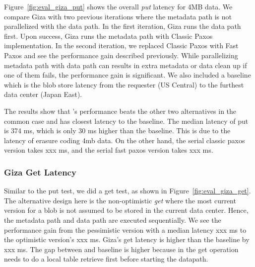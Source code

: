 Figure~\ref{fig:eval_giza_put} shows the \name overall {\em put} latency for 4MB data. We compare Giza with two previous iterations where the metadata path is not parallelized with the data path. In the first iteration, Giza runs the data path first. Upon success, Giza runs the metadata path with Classic Paxos implementation. In the second iteration, we replaced Classic Paxos with Fast Paxos and see the performance gain described previously. While parallelizing metadata path with data path can results in extra metadata or data clean up if one of them fails, the performance gain is significant. We also included a baseline which is the blob store latency from the requester (US Central) to the furthest data center (Japan East).

The results show that \name's performance beats the other two alternatives in the common case and has closest
latency to the baseline. The median latency of \name put is 374 ms, which is only 30 ms
higher than the baseline. This is due to the latency of erasure coding 4mb data. On the other hand, the serial classic paxos version takes 
xxx ms, and the serial fast paxos version takes xxx ms.

\subsubsection{Giza Get Latency}

Similar to the put test, we did a \name get test, as shown in Figure~\ref{fig:eval_giza_get}. The alternative design here is the non-optimistic {\em get } where the most current version for a blob is not assumed to be stored in the current data center. Hence, the metadata path and data path are executed sequentially. We see the performance gain from the pessimistic version with a median latency xxx ms to the optimistic version's xxx ms. Giza's get latency is higher than the baseline by xxx ms. The gap between \name and baseline is higher because in the get operation \name needs to do a local table retrieve first before starting the datapath. 





